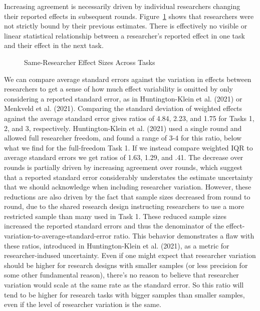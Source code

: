 \documentclass[
  letterpaper,
  DIV=11,
  numbers=noendperiod]{scrartcl}
\begin{document}
Increasing agreement is necessarily driven by individual researchers
changing their reported effects in subsequent rounds.
Figure~\ref{fig-effects-compare-rounds} shows that researchers were not
strictly bound by their previous estimates. There is effectively no
visible or linear statistical relationship between a researcher's
reported effect in one task and their effect in the next task.

\begin{figure}


\caption{\label{fig-effects-compare-rounds}Same-Researcher Effect Sizes
Across Tasks}

\end{figure}%

We can compare average standard errors against the variation in effects
between researchers to get a sense of how much effect variability is
omitted by only considering a reported standard error, as in
Huntington-Klein et al. (2021) or Menkveld et al. (2021). Comparing the
standard deviation of weighted effects against the average standard
error gives ratios of 4.84, 2.23, and 1.75 for Tasks 1, 2, and 3,
respectively. Huntington-Klein et al. (2021) used a single round and
allowed full researcher freedom, and found a range of 3-4 for this
ratio, below what we find for the full-freedom Task 1. If we instead
compare weighted IQR to average standard errors we get ratios of 1.63,
1.29, and .41. The decrease over rounds is partially driven by
increasing agreement over rounds, which suggest that a reported standard
error considerably understates the estimate uncertainty that we should
acknowledge when including researcher variation. However, these
reductions are also driven by the fact that sample sizes decreased from
round to round, due to the shared research design instructing
researchers to use a more restricted sample than many used in Task 1.
These reduced sample sizes increased the reported standard errors and
thus the denominator of the effect-variation-to-average-standard-error
ratio. This behavior demonstrates a flaw with these ratios, introduced
in Huntington-Klein et al. (2021), as a metric for researcher-indused
uncertainty. Even if one might expect that researcher variation should
be higher for research designs with smaller samples (or less precision
for some other fundamental reason), there's no reason to believe that
researcher variation would scale at the same rate as the standard error.
So this ratio will tend to be higher for research tasks with bigger
samples than smaller samples, even if the level of researcher variation
is the same.
\end{document}

